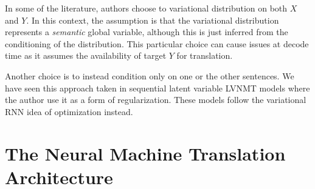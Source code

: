 In some of the literature, authors choose to variational distribution on both $X$ and $Y$. In this context, the assumption is that the variational distribution represents a \textit{semantic} global variable, although this is just inferred from the conditioning of the distribution. This particular choice can cause issues at decode time as it assumes the availability of target $Y$ for translation. 

Another choice is to instead condition only on one or the other sentences. We have seen this approach taken in sequential latent variable \ac{LVNMT} models where the author use it as a form of regularization. These models follow  the variational \ac{RNN} idea of optimization instead. 

\section{The Neural Machine Translation Architecture}